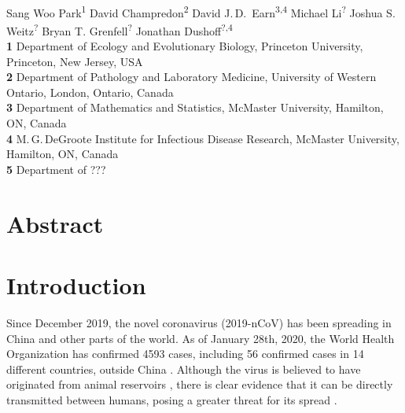 \documentclass[12pt]{article}
\date{\today}
\begin{document}
\begin{flushleft}{
	\Large
	\textbf{}
}
\newline
\\
Sang Woo Park\textsuperscript{1}
David Champredon\textsuperscript{2}
David J.\,D.\ Earn\textsuperscript{3,4}
Michael Li\textsuperscript{?}
Joshua S. Weitz\textsuperscript{?}
Bryan T. Grenfell\textsuperscript{?}
Jonathan Dushoff\textsuperscript{?,4}
\\
\bigskip
\textbf{1} Department of Ecology and Evolutionary Biology, Princeton University, Princeton, New Jersey, USA
\\
\textbf{2} Department of Pathology and Laboratory Medicine, University of Western Ontario, London, Ontario, Canada
\\
\textbf{3} Department of Mathematics and Statistics, McMaster University, Hamilton, ON, Canada
\\
\textbf{4} M.\,G.\,DeGroote Institute for Infectious Disease Research, McMaster University, Hamilton, ON, Canada
\\
\textbf{5} Department of ???
\\
\bigskip

\end{flushleft}

\section*{Abstract}

\pagebreak

\section{Introduction}

Since December 2019, the novel coronavirus (2019-nCoV) has been spreading in China and other parts of the world.
As of January 28th, 2020, the World Health Organization has confirmed 4593 cases, including 56 confirmed cases in 14 different countries, outside China \citep{who28report}.
Although the virus is believed to have originated from animal reservoirs \citep{cdcncov}, 
there is clear evidence that it can be directly transmitted between humans,
posing a greater threat for its spread \citep{huang2020clinical,who26report}.
\end{document}
